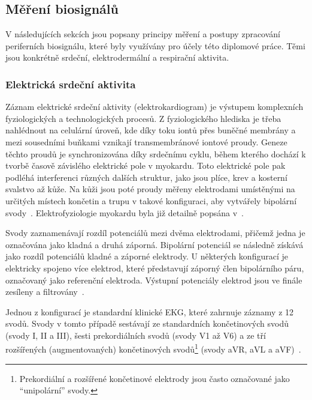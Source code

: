\subsection{Měření biosignálů}
\label{subsec:srdecni_aktivita}
V následujících sekcích jsou popsany principy měření a postupy zpracování
periferních biosignálu, které byly využívány pro účely této diplomové práce.
Těmi jsou konkrétně srdeční, elektrodermální a respirační aktivita.

\subsubsection{Elektrická srdeční aktivita}
Záznam elektrické srdeční aktivity (elektrokardiogram) je výstupem komplexních
fyziologických a technologických procesů. Z fyziologického hlediska je třeba
nahlédnout na celulární úroveň, kde díky toku iontů přes buněčné membrány a mezi
sousedními buňkami vznikají transmembránové iontové proudy. Geneze těchto proudů
je synchronizována díky srdečnímu cyklu, během kterého dochází k tvorbě časově
závislého elektrické pole v myokardu. Toto elektrické pole pak podléhá
interferenci různých dalších struktur, jako jsou plíce, krev a kosterní svalstvo
až kůže. Na kůži jsou poté proudy měřeny elektrodami umístěnými na určitých
místech končetin a trupu v takové konfiguraci, aby vytvářely bipolární
svody~\cite{mirvis2001}. Elektrofyziologie myokardu byla již detailně popsána
v~\cite{Goldberger2017,Cihak2016,Stejfa2006,Weinhaus2005}.

Svody zaznamenávají rozdíl potenciálů mezi dvěma elektrodami, přičemž jedna je
označována jako kladná a druhá záporná. Bipolární potenciál se následně získává
jako rozdíl potenciálů kladné a záporné elektrody. U některých konfigurací je
elektricky spojeno více elektrod, které představují záporný člen bipolárního
páru, označovaný jako referenční elektroda. Výstupní potenciály elektrod jsou ve
finále zesíleny a filtrovány~\cite{Goldberger2017,mirvis2001}.

Jednou z konfigurací je standardní klinické EKG, které zahrnuje záznamy z 12
svodů. Svody v tomto případě sestávají ze standardních končetinových svodů
(svody I, II a III), šesti prekordiálních svodů (svody V1 až V6) a ze tří
rozšířených (augmentovaných) končetinových svodů\footnote{Prekordiální a
rozšířené končetinové elektrody jsou často označované jako \enquote{unipolární}
svody.} (svody aVR, aVL a aVF)~\cite{Goldberger2017,mirvis2001}.

